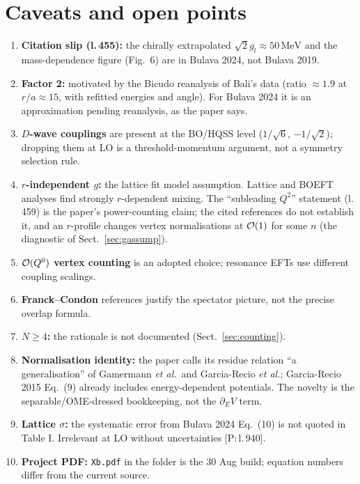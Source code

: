 \documentclass[11pt,a4paper]{article}
\newcommand{\tagP}[1]{\textcolor{blue!65!black}{\textsf{\small[P:\,#1]}}}
\newcommand{\MeV}{\,\mathrm{MeV}}
\begin{document}
\section{Caveats and open points}
\label{sec:caveats}

\begin{enumerate}
\item \textbf{Citation slip (l.\,455):} the chirally extrapolated $\sqrt2g_l\approx50\MeV$ and the mass-dependence figure (Fig.~6) are in Bulava 2024, not Bulava 2019.
\item \textbf{Factor 2:} motivated by the Bicudo reanalysis of Bali's data (ratio $\approx1.9$ at $r/a\approx15$, with refitted energies and angle). For Bulava 2024 it is an approximation pending reanalysis, as the paper says.
\item \textbf{$D$-wave couplings} are present at the BO/HQSS level ($1/\sqrt6$, $-1/\sqrt2$); dropping them at LO is a threshold-momentum argument, not a symmetry selection rule.
\item \textbf{$r$-independent $g$:} the lattice fit model assumption. Lattice and BOEFT analyses find strongly $r$-dependent mixing. The ``subleading $Q^2$'' statement (l.\,459) is the paper's power-counting claim; the cited references do not establish it, and an $r$-profile changes vertex normalisations at ${\cal O}(1)$ for some $n$ (the diagnostic of Sect.~\ref{sec:gassump}).
\item \textbf{${\cal O}(Q^0)$ vertex counting} is an adopted choice; resonance EFTs use different coupling scalings.
\item \textbf{Franck--Condon} references justify the spectator picture, not the precise overlap formula.
\item \textbf{$N\ge4$:} the rationale is not documented (Sect.~\ref{sec:counting}).
\item \textbf{Normalisation identity:} the paper calls its residue relation ``a generalisation'' of Gamermann \emph{et al.}\ and Garcia-Recio \emph{et al.}; Garcia-Recio 2015 Eq.~(9) already includes energy-dependent potentials. The novelty is the separable/OME-dressed bookkeeping, not the $\partial_EV$ term.
\item \textbf{Lattice $\sigma$:} the systematic error from Bulava 2024 Eq.~(10) is not quoted in Table I. Irrelevant at LO without uncertainties \tagP{l.\,940}.
\item \textbf{Project PDF:} \texttt{Xb.pdf} in the folder is the 30 Aug build; equation numbers differ from the current source.
\end{enumerate}
\end{document}
